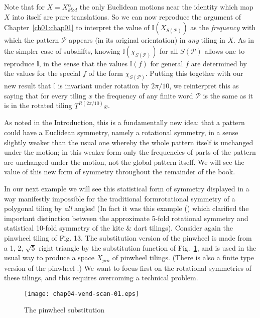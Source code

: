 \documentclass[reqno]{stml-l}
\theoremstyle{plain}
\theoremstyle{definition}
\numberwithin{equation}{chapter}
\begin{document}
Note that for $X=X_{k \& d}^{\alpha}$ the only Euclidean motions near the identity which map $X$ into itself are pure translations. So we can now reproduce the argument of Chapter~\ref{ch01:chap01} to interpret the value of $\mathbb{I}(X_{S(\mathcal{P})})$ as the \emph{frequency} with which the pattern $\mathcal{P}$ appears (in its original orientation) in \emph{any} tiling in $X$. As in the simpler case of subshifts, knowing $\mathbb{I}(\chi_{S(\mathcal{P})})$ for all $S(\mathcal{P})$ allows one to reproduce $\mathbb{I}$, in the sense that the values $\mathbb{I}(f)$ for general $f$ are determined by the values for the special $f$ of the form $\chi_{S(\mathcal{P})}$. Putting this together with our new result that $\mathbb{I}$ is invariant under rotation by $2\pi/10$, we reinterpret this as saying that for every tiling $x$ the frequency of any finite word $\mathcal{P}$ is the same as it is in the rotated tiling $T^{R(2\pi/10)}x$.

As noted in the Introduction, this is a fundamentally new idea: that a pattern could have a Euclidean symmetry, namely a rotational symmetry, in a sense slightly weaker than the usual one whereby the whole pattern itself is unchanged under the motion; in this weaker form only the frequencies of parts of the pattern are unchanged under the motion, not the global pattern itself. We will see the value of this new form of symmetry throughout the remainder of the book.

In our next example we will see this statistical form of symmetry displayed in a way manifestly impossible for the traditional formrotational symmetry of a polygonal tiling by \emph{all} angles! (In fact it was this example (\cite{bib:Ra4}) which clarified the important distinction between the approximate 5-fold rotational symmetry and statistical 10-fold symmetry of the kite \& dart tilings). Consider again the pinwheel tiling of Fig. 13. The substitution version of the pinwheel is made from a 1, 2, $\sqrt{5}$ right triangle by the substitution function of Fig.~\ref{ch04:fig30}, and is used in the usual way to produce a space $X_{pin}$ of pinwheel tilings. (There is also a finite type version of the pinwheel \cite{bib:Ra2}.) We want to focus first on the rotational symmetries of these tilings, and this requires overcoming a technical problem.
\begin{figure}[!h]
\texttt{[image: chap04-vend-scan-01.eps]}
\caption{The pinwheel substitution}\label{ch04:fig30}
\end{figure}
\end{document}
